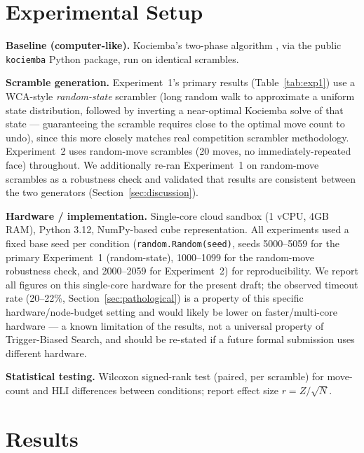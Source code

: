 \documentclass[10pt,conference]{article}
\begin{document}
\section{Experimental Setup}
\label{sec:setup}

\textbf{Baseline (computer-like).} Kociemba's two-phase algorithm
\citep{kociemba}, via the public \texttt{kociemba} Python package,
run on identical scrambles.

\textbf{Scramble generation.} Experiment~1's primary results
(Table~\ref{tab:exp1}) use a WCA-style \emph{random-state} scrambler
(long random walk to approximate a uniform state distribution,
followed by inverting a near-optimal Kociemba solve of that state ---
guaranteeing the scramble requires close to the optimal move count
to undo), since this more closely matches real competition scrambler
methodology. Experiment~2 uses random-move scrambles (20 moves, no
immediately-repeated face) throughout. We additionally re-ran
Experiment~1 on random-move scrambles as a robustness check and
validated that results are consistent between the two generators
(Section~\ref{sec:discussion}).

\textbf{Hardware / implementation.} Single-core cloud sandbox (1 vCPU,
4GB RAM), Python 3.12, NumPy-based cube representation. All
experiments used a fixed base seed per condition
(\texttt{random.Random(seed)}, seeds 5000--5059 for the primary
Experiment~1 (random-state), 1000--1099 for the random-move
robustness check, and 2000--2059 for Experiment~2) for
reproducibility. We report all
figures on this single-core hardware for the present draft; the
observed timeout rate (20--22\%, Section~\ref{sec:pathological}) is a
property of this specific hardware/node-budget setting and would
likely be lower on faster/multi-core hardware --- a known limitation
of the results, not a universal property of Trigger-Biased Search,
and should be re-stated if a future formal submission uses different
hardware.

\textbf{Statistical testing.} Wilcoxon signed-rank test (paired, per
scramble) for move-count and HLI differences between conditions;
report effect size $r = Z/\sqrt{N}$.

\section{Results}
\label{sec:results}
\end{document}
